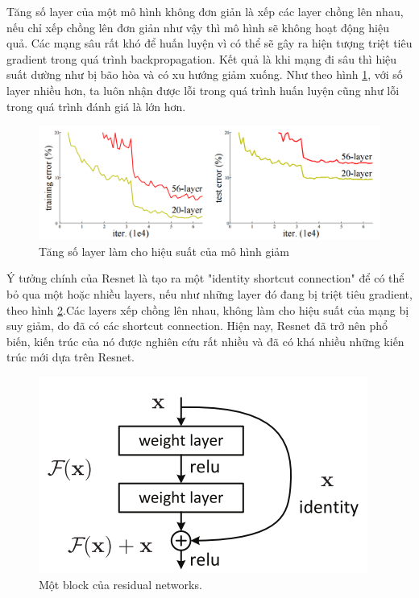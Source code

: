 Tăng số layer của một mô hình không đơn giản là xếp các layer chồng lên nhau, nếu chỉ xếp chồng lên đơn giản như vậy thì mô hình sẽ không hoạt động hiệu quả. Các mạng sâu rất khó để huấn luyện vì có thể sẽ gây ra hiện tượng triệt tiêu gradient trong quá trình backpropagation. Kết quả là khi mạng đi sâu thì hiệu suất dường như bị bão hòa và có xu hướng giảm xuống. Như theo hình \ref{fig:resnet_layer}, với số layer nhiều hơn, ta luôn nhận được lỗi trong quá trình huấn luyện cũng như lỗi trong quá trình đánh giá là lớn hơn.\\

\begin{center}
    \begin{figure}[H]
    \begin{center}
     \includegraphics[scale=.25]{image/chapter3_resnet_compare}
    \end{center}
    \caption{Tăng số layer làm cho hiệu suất của mô hình giảm}
    \label{fig:resnet_layer}
    \end{figure}
\end{center}


Ý tưởng chính của Resnet là tạo ra một "identity shortcut connection" để có thể bỏ qua một hoặc nhiều layers, nếu như những layer đó đang bị triệt tiêu gradient, theo hình \ref{fig:resnet_block}.Các layers xếp chồng lên nhau, không làm cho hiệu suất của mạng bị suy giảm, do đã có các shortcut connection. Hiện nay, Resnet đã trở nên phổ biến, kiến trúc của nó được nghiên cứu rất nhiều và đã có khá nhiều những kiến trúc mới dựa trên Resnet.

\begin{center}
    \begin{figure}[H]
    \begin{center}
     \includegraphics[scale=.5]{image/chapter3_resnet_block}
    \end{center}
    \caption{Một block của residual networks.}
    \label{fig:resnet_block}
    \end{figure}
\end{center}



 




 
